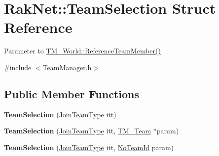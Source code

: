 \hypertarget{struct_rak_net_1_1_team_selection}{\section{Rak\-Net\-:\-:Team\-Selection Struct Reference}
\label{struct_rak_net_1_1_team_selection}
}


Parameter to \hyperlink{class_rak_net_1_1_t_m___world_a13c60cbb4d1894aece9e1b1b9887601f}{T\-M\-\_\-\-World\-::\-Reference\-Team\-Member()}  




{\ttfamily \#include $<$Team\-Manager.\-h$>$}

\subsection*{Public Member Functions}
\begin{DoxyCompactItemize}
\item 
\hypertarget{struct_rak_net_1_1_team_selection_aade43e2b34830d14063c8f31e3e5ed97}{{\bfseries Team\-Selection} (\hyperlink{group___t_e_a_m___m_a_n_a_g_e_r___g_r_o_u_p_ga8a8704b992ae17ee4789b2ba4cc4b34b}{Join\-Team\-Type} itt)}\label{struct_rak_net_1_1_team_selection_aade43e2b34830d14063c8f31e3e5ed97}

\item 
\hypertarget{struct_rak_net_1_1_team_selection_a0060cb3bb81750d286aedd1ae782293b}{{\bfseries Team\-Selection} (\hyperlink{group___t_e_a_m___m_a_n_a_g_e_r___g_r_o_u_p_ga8a8704b992ae17ee4789b2ba4cc4b34b}{Join\-Team\-Type} itt, \hyperlink{class_rak_net_1_1_t_m___team}{T\-M\-\_\-\-Team} $\ast$param)}\label{struct_rak_net_1_1_team_selection_a0060cb3bb81750d286aedd1ae782293b}

\item 
\hypertarget{struct_rak_net_1_1_team_selection_adcef9932fe3228b725d3fb8f9fc2d53d}{{\bfseries Team\-Selection} (\hyperlink{group___t_e_a_m___m_a_n_a_g_e_r___g_r_o_u_p_ga8a8704b992ae17ee4789b2ba4cc4b34b}{Join\-Team\-Type} itt, \hyperlink{group___t_e_a_m___m_a_n_a_g_e_r___g_r_o_u_p_gadd1e99b7724ceb0f6794f46de31a6b02}{No\-Team\-Id} param)}\label{struct_rak_net_1_1_team_selection_adcef9932fe3228b725d3fb8f9fc2d53d}

\end{DoxyCompactItemize}
